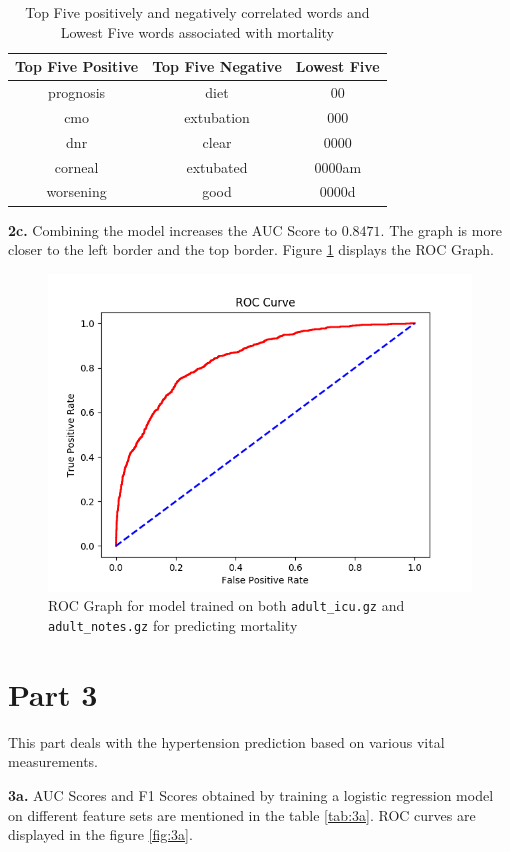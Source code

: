 \documentclass[]{article}
\begin{document}
\begin{table}[t]
	\centering
	\begin{tabular}{|c|c|c|}
		\hline
		\textbf{Top Five Positive} & \textbf{Top Five Negative} & \textbf{Lowest Five}\\
		\hline
		prognosis & diet & 00\\
		cmo & extubation & 000\\
		dnr & clear & 0000\\
		corneal & extubated & 0000am\\
		worsening & good & 0000d\\
		\hline
	\end{tabular}
	\caption{Top Five positively and negatively correlated words and Lowest Five words associated with mortality}
	\label{tab:2b}
\end{table}

\textbf{2c.} Combining the model increases the AUC Score to $0.8471$. The graph is more closer to the left border and the top border. Figure \ref{fig:roc2c} displays the ROC Graph.

\begin{figure}
	\centering
	\includegraphics[width=0.8\linewidth]{ROC_part2c.png}
	\caption{ROC Graph for model trained on both \texttt{adult\_icu.gz} and \texttt{adult\_notes.gz} for predicting mortality}
	\label{fig:roc2c}
\end{figure}


\section*{Part 3}

This part deals with the hypertension prediction based on various vital measurements.

\textbf{3a.} AUC Scores and F1 Scores obtained by training a logistic regression model on different feature sets are mentioned in the table \ref{tab:3a}. ROC curves are displayed in the figure \ref{fig:3a}.
\end{document}

